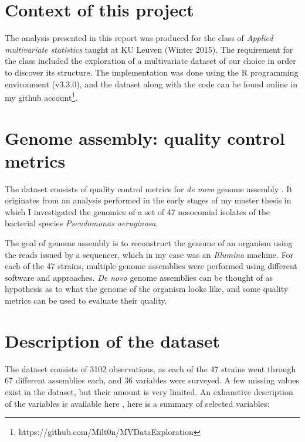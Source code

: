 \documentclass[11pt, a4paper,titlepage]{article}
\begin{document}


\section{Context of this project}

The analysis presented in this report was produced for the class of
\emph{Applied multivariate statistics} taught at KU Leuven (Winter
2015). The requirement for the class included the exploration of a
multivariate dataset of our choice in order to discover its
structure. The implementation was done using the R programming
environment (v3.3.0), and the dataset along with the code can be found
online in my github
account\footnote{https://github.com/Milt0n/MVDataExploration}.

\section{Genome assembly: quality control metrics}

The dataset consists of quality control metrics for \emph{de novo}
genome assembly \cite{baker2012novo}. It originates from an analysis
performed in the early stages of my master thesis in which I
investigated the genomics of a set of 47 nosocomial isolates of the
bacterial species \emph{Pseudomonas aeruginosa}.

The goal of genome assembly is to reconstruct the genome of an
organism using the reads issued by a sequencer, which in my case was
an \emph{Illumina} machine. For each of the 47 strains, multiple
genome assemblies were performed using different software and
approaches. \emph{De novo} genome assemblies can be thought of as
hypothesis as to what the genome of the organism looks like, and some
quality metrics can be used to evaluate their quality.

\section{Description of the dataset}

The dataset consists of 3102 observations, as each of the 47 strains
went through 67 different assemblies each, and 36 variables were
surveyed. A few missing values exist in the dataset, but their amount
is very limited. An exhaustive description of the variables is
available here \cite{gurevich2013quast}, here is a summary of selected
variables:
\end{document}
